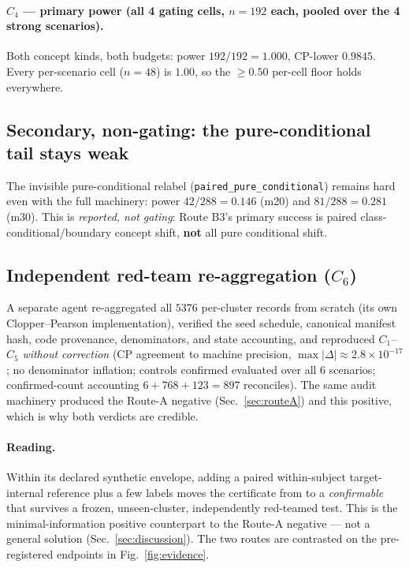 \paragraph{$C_4$ --- primary power (all 4 gating cells, $n=192$ each, pooled over the 4 strong scenarios).}
Both concept kinds, both budgets: power $192/192=1.000$, CP-lower $0.9845$. Every per-scenario cell
($n=48$) is $1.00$, so the $\geq 0.50$ per-cell floor holds everywhere.

\subsection{Secondary, non-gating: the pure-conditional tail stays weak}
The invisible pure-conditional relabel (\texttt{paired\_pure\_conditional}) remains hard even with the full
machinery: power $42/288=0.146$ (m20) and $81/288=0.281$ (m30). This is \emph{reported, not gating}: Route
B3's primary success is paired class-conditional/boundary concept shift, \textbf{not} all pure conditional
shift. 

\subsection{Independent red-team re-aggregation ($C_6$)}
\label{sec:b3-c6}
A separate agent re-aggregated all $5376$ per-cluster records from scratch (its own Clopper--Pearson
implementation), verified the seed schedule, canonical manifest hash, code provenance, denominators, and
state accounting, and reproduced $C_1$--$C_5$ \emph{without correction} (CP agreement to machine precision,
$\max|\Delta|\approx 2.8\times10^{-17}$; no denominator inflation; controls confirmed evaluated over all $6$
scenarios; confirmed-count accounting $6+768+123=897$ reconciles). The same audit machinery produced the
Route-A negative (Sec.~\ref{sec:routeA}) and this positive, which is why both verdicts are credible. 

\paragraph{Reading.}
Within its declared synthetic envelope, adding a paired within-subject target-internal reference plus a few
labels moves the certificate from \stunid{} to a \emph{confirmable} \stconf{} that survives a frozen,
unseen-cluster, independently red-teamed test. This is the minimal-information positive counterpart to the
Route-A negative --- not a general solution (Sec.~\ref{sec:discussion}). The two routes are contrasted on the
pre-registered endpoints in Fig.~\ref{fig:evidence}.

